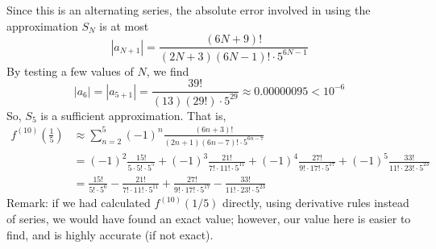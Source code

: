 \begin{solution}
Since this is an alternating series, the absolute error involved in using the approximation $S_N$ is at most
\[|a_{N+1}|=\frac{(6N+9)!}{(2N+3)(6N-1)!\cdot 5^{6N-1}}\]
By testing a few values of $N$, we find
\[|a_6|=|a_{5+1}|=\frac{39!}{(13)(29!)\cdot 5^{29}}\approx 0.00000095<10^{-6}\]
So, $S_5$ is a sufficient approximation. That is,
\begin{align*}
f^{(10)}\left(\frac15\right)&\approx \sum_{n=2}^5 (-1)^n\frac{(6n+3)!}{(2n+1)(6n-7)!\cdot 5^{6n-7}}\\
&=(-1)^2\frac{15!}{5\cdot 5!\cdot 5^{5}}+(-1)^3\frac{21!}{7!\cdot 11!\cdot 5^{11}}+
(-1)^4\frac{27!}{9!\cdot 17!\cdot 5^{17}}+
(-1)^5\frac{33!}{11!\cdot 23!\cdot 5^{23}}\\
&=\frac{15!}{5!\cdot5^6}-\frac{21!}{7!\cdot 11!\cdot 5^{11}}+\frac{27!}{9!\cdot 17!\cdot 5^{17}}-\frac{33!}{11!\cdot 23!\cdot 5^{23}}
\end{align*}
Remark: if we had calculated $f^{(10)}(1/5)$ directly, using derivative rules instead of series, we would have found an exact value; however, our value here is easier to find, and is highly accurate (if not exact).
\end{solution}


